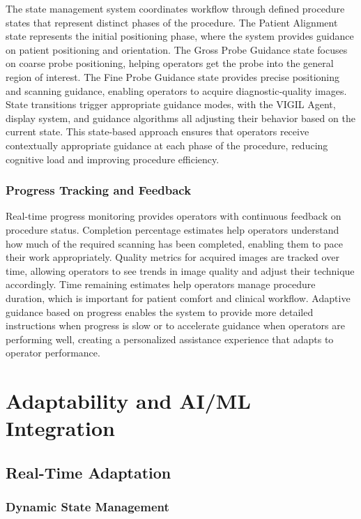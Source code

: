 \documentclass[12pt,a4paper]{article}
\begin{document}
The state management system coordinates workflow through defined procedure states that represent distinct phases of the procedure. The Patient Alignment state represents the initial positioning phase, where the system provides guidance on patient positioning and orientation. The Gross Probe Guidance state focuses on coarse probe positioning, helping operators get the probe into the general region of interest. The Fine Probe Guidance state provides precise positioning and scanning guidance, enabling operators to acquire diagnostic-quality images. State transitions trigger appropriate guidance modes, with the VIGIL Agent, display system, and guidance algorithms all adjusting their behavior based on the current state. This state-based approach ensures that operators receive contextually appropriate guidance at each phase of the procedure, reducing cognitive load and improving procedure efficiency.

\subsubsection{Progress Tracking and Feedback}

Real-time progress monitoring provides operators with continuous feedback on procedure status. Completion percentage estimates help operators understand how much of the required scanning has been completed, enabling them to pace their work appropriately. Quality metrics for acquired images are tracked over time, allowing operators to see trends in image quality and adjust their technique accordingly. Time remaining estimates help operators manage procedure duration, which is important for patient comfort and clinical workflow. Adaptive guidance based on progress enables the system to provide more detailed instructions when progress is slow or to accelerate guidance when operators are performing well, creating a personalized assistance experience that adapts to operator performance.

\section{Adaptability and AI/ML Integration}

\subsection{Real-Time Adaptation}

\subsubsection{Dynamic State Management}
\end{document}
